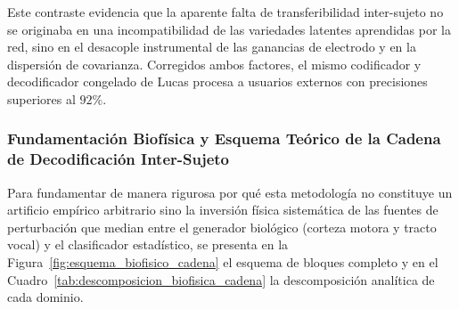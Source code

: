 \documentclass[11pt,a4paper,openany]{book}
\theoremstyle{definition}
\begin{document}
Este contraste evidencia que la aparente falta de transferibilidad inter-sujeto no se originaba en una incompatibilidad de las variedades latentes aprendidas por la red, sino en el desacople instrumental de las ganancias de electrodo y en la dispersión de covarianza. Corregidos ambos factores, el mismo codificador y decodificador congelado de Lucas procesa a usuarios externos con precisiones superiores al $92\%$.

\subsubsection{Fundamentación Biofísica y Esquema Teórico de la Cadena de Decodificación Inter-Sujeto}
\label{subsubsec:fundamentacion_biofisica_teorica}

Para fundamentar de manera rigurosa por qué esta metodología no constituye un artificio empírico arbitrario sino la inversión física sistemática de las fuentes de perturbación que median entre el generador biológico (corteza motora y tracto vocal) y el clasificador estadístico, se presenta en la Figura~\ref{fig:esquema_biofisico_cadena} el esquema de bloques completo y en el Cuadro~\ref{tab:descomposicion_biofisica_cadena} la descomposición analítica de cada dominio.
\end{document}
